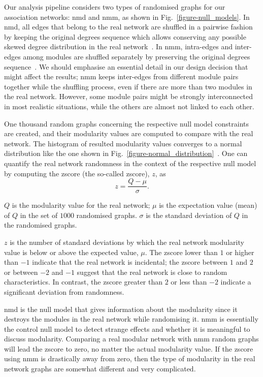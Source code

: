 Our analysis pipeline considers two types of randomised graphs for our association networks: \ac{nmd} and \ac{nmm}, as shown in Fig.~\ref{figure-null_models}. In \acs{nmd}, all edges that belong to the real network are shuffled in a pairwise fashion by keeping the original degrees sequence which allows conserving any possible skewed degree distribution in the real network~\cite{Maslov910, Fretter2012, FORTUNATO201075}. In \acs{nmm}, intra-edges and inter-edges among modules are shuffled separately by preserving the original degrees sequence~\cite{Fretter2012}. We should emphasise an essential detail in our design decision that might affect the results; \acs{nmm} keeps inter-edges from different module pairs together while the shuffling process, even if there are more than two modules in the real network. However, some module pairs might be strongly interconnected in most realistic situations, while the others are almost not linked to each other.


One thousand random graphs concerning the respective null model constraints are created, and their modularity values are computed to compare with the real network. The histogram of resulted modularity values converges to a normal distribution like the one shown in Fig.~\ref{figure-normal_distribution}~\cite{normaldistribution}. One can quantify the real network randomness in the context of the respective null model by computing the \acl{zscore} (the so-called \acs{zscore}), $z$, as
\begin{equation} %
	z = \frac{Q-\mu}{\sigma}.
	\label{zscore}
\end{equation} 

$Q$ is the modularity value for the real network; $\mu$ is the expectation value (mean) of $Q$ in the set of $1000$ randomised graphs. $\sigma$ is the standard deviation of $Q$ in the randomised graphs.

$z$ is the number of standard deviations by which the real network modularity value is below or above the expected value, $\mu$. The \acs{zscore} lower than $1$ or higher than $-1$ indicate that the real network is incidental; the \acs{zscore} between $1$ and $2$ or between $-2$ and $-1$ suggest that the real network is close to random characteristics. In contrast, the \acs{zscore} greater than $2$ or less than $-2$ indicate a significant deviation from randomness.

\acs{nmd} is the null model that gives information about the modularity since it destroys the modules in the real network while randomising it. \acs{nmm} is essentially the control null model to detect strange effects and whether it is meaningful to discuss modularity. Comparing a real modular network with \acs{nmm} random graphs will lead the \acs{zscore} to zero, no matter the actual modularity value. If the \acs{zscore} using \acs{nmm} is drastically away from zero, then the type of modularity in the real network graphs are somewhat different and very complicated.

